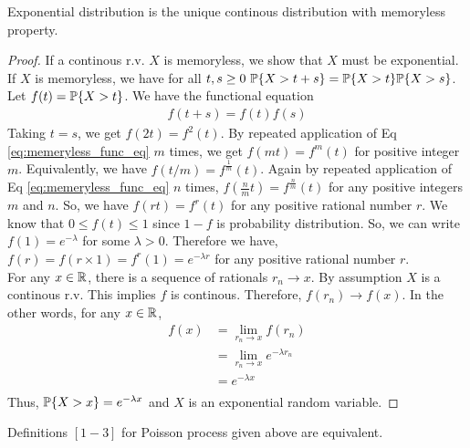 \documentclass[a4paper,10pt,english]{article}
\begin{document}
\begin{thm}[] 
Exponential distribution is the unique continous distribution with memoryless property.
\begin{proof}
If a continous r.v. $X$ is memoryless, we show that $X$ must be exponential. If $X$ is memoryless, we have for all $t,s\geq 0\ \P\{X>t+s\} = \P\{X>t\} \P\{X>s\}$. Let $f(t) = \P\{X>t\}$. We have the functional equation
\begin{align}
\label{eq:memeryless_func_eq}
f(t+s) = f(t) f(s)
\end{align}
Taking $t=s$, we get $f(2t) = f^2(t)$. By repeated application of Eq \ref{eq:memeryless_func_eq} $m$ times, we get $f(mt) = f^m(t)$ for positive integer $m$. Equivalently, we have $f(t/m) =f^{\frac{1}{m}}(t)$. Again by repeated application of Eq \ref{eq:memeryless_func_eq} $n$ times, $f(\frac{n}{m}t) =f^{\frac{n}{m}}(t)$ for any positive integers $m$ and $n$. So, we have $f(rt) = f^r(t)$ for any positive rational number $r$. We know that $0\leq f(t) \leq 1$ since $1-f$ is probability distribution. So, we can write $f(1) = e^{-\lambda}$ for some $\lambda > 0$. Therefore we have, $f(r) = f(r \times 1) = f^r(1) = e^{-\lambda r}$ for any positive rational number $r$. \\
\indent For any $x \in \R$, there is a sequence of rationals $r_n \rightarrow x$. By assumption $X$ is a continous r.v. This implies $f$ is continous. Therefore, $f(r_n) \rightarrow f(x)$. In the other words, for any $x \in \R$,
\begin{align*}
f(x) &= \lim_{r_n \rightarrow x} f(r_n) \\
 &= \lim_{r_n \rightarrow x} e^{-\lambda r_n} \\
 &= e^{-\lambda x} \\ 
\end{align*}
Thus, $\P\{X>x\} = e^{-\lambda x}$ and $X$ is an exponential random variable.
\end{proof}
\end{thm}

Definitions $[1-3]$ for Poisson process given above are equivalent. 
\end{document}
